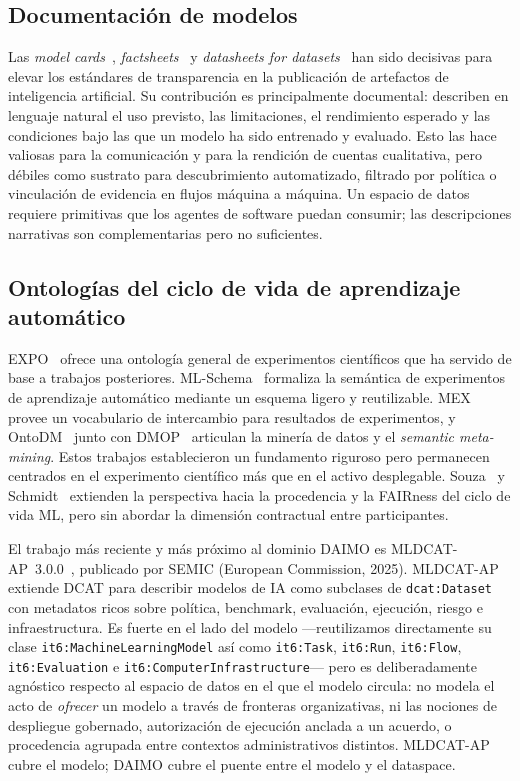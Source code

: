 \documentclass[11pt,a4paper]{article}
\newcommand{\code}[1]{\texttt{#1}}
\begin{document}
\subsection{Documentación de modelos}

Las \emph{model cards}~\cite{mitchell19}, \emph{factsheets}~\cite{arnold19} y \emph{datasheets for datasets}~\cite{gebru21} han sido decisivas para elevar los estándares de transparencia en la publicación de artefactos de inteligencia artificial. Su contribución es principalmente documental: describen en lenguaje natural el uso previsto, las limitaciones, el rendimiento esperado y las condiciones bajo las que un modelo ha sido entrenado y evaluado. Esto las hace valiosas para la comunicación y para la rendición de cuentas cualitativa, pero débiles como sustrato para descubrimiento automatizado, filtrado por política o vinculación de evidencia en flujos máquina a máquina. Un espacio de datos requiere primitivas que los agentes de software puedan consumir; las descripciones narrativas son complementarias pero no suficientes.

\subsection{Ontologías del ciclo de vida de aprendizaje automático}

EXPO~\cite{expo} ofrece una ontología general de experimentos científicos que ha servido de base a trabajos posteriores. ML-Schema~\cite{mls} formaliza la semántica de experimentos de aprendizaje automático mediante un esquema ligero y reutilizable. MEX~\cite{mex} provee un vocabulario de intercambio para resultados de experimentos, y OntoDM~\cite{ontodm} junto con DMOP~\cite{dmop} articulan la minería de datos y el \emph{semantic meta-mining}. Estos trabajos establecieron un fundamento riguroso pero permanecen centrados en el experimento científico más que en el activo desplegable. Souza~\cite{souza19} y Schmidt~\cite{schmidt21} extienden la perspectiva hacia la procedencia y la FAIRness del ciclo de vida ML, pero sin abordar la dimensión contractual entre participantes.

El trabajo más reciente y más próximo al dominio DAIMO es MLDCAT-AP~3.0.0~\cite{mldcatap}, publicado por SEMIC (European Commission, 2025). MLDCAT-AP extiende DCAT para describir modelos de IA como subclases de \code{dcat:Dataset} con metadatos ricos sobre política, benchmark, evaluación, ejecución, riesgo e infraestructura. Es fuerte en el lado del modelo ---reutilizamos directamente su clase \code{it6:MachineLearningModel} así como \code{it6:Task}, \code{it6:Run}, \code{it6:Flow}, \code{it6:Evaluation} e \code{it6:ComputerInfrastructure}--- pero es deliberadamente agnóstico respecto al espacio de datos en el que el modelo circula: no modela el acto de \emph{ofrecer} un modelo a través de fronteras organizativas, ni las nociones de despliegue gobernado, autorización de ejecución anclada a un acuerdo, o procedencia agrupada entre contextos administrativos distintos. MLDCAT-AP cubre el modelo; DAIMO cubre el puente entre el modelo y el dataspace.
\end{document}
